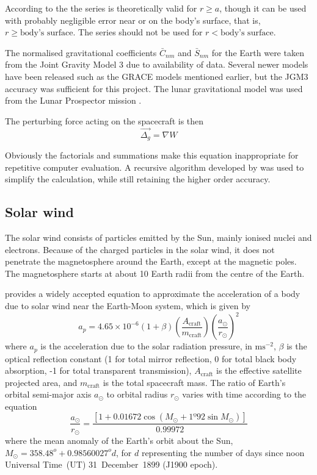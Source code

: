 According to the \textcite{WGS84} the series is theoretically valid for $r\geq a$, though it can be used with probably negligible error near or on the body's surface, that is, $r\geq\text{body's surface}$. The series should not be used for $r<\text{body's surface}$.

The normalised gravitational coefficients $\bar{C}_{nm}$ and $\bar{S}_{nm}$ for the Earth were taken from the Joint Gravity Model 3 \parencite[JGM3,][]{Tapley1996} due to availability of data. Several newer models have been released such as the GRACE models mentioned earlier, but the JGM3 accuracy was sufficient for this project. The lunar gravitational model was used from the Lunar Prospector mission \parencite{Konopliv2001}.

The perturbing force acting on the spacecraft is then
\begin{equation}
\vec{\Delta_g}=\nabla W\label{eq:Oblateness-perturbation}
\end{equation}

Obviously the factorials and summations make this equation inappropriate for repetitive computer evaluation. A recursive algorithm developed by \textcite{Montenbruck2000} was used to simplify the calculation, while still retaining the higher order accuracy. 


\subsection{Solar wind} \label{sub:Solar-Wind}

The solar wind consists of particles emitted by the Sun, mainly ionised nuclei and electrons. Because of the charged particles in the solar wind, it does not penetrate the magnetosphere around the Earth, except at the magnetic poles. The magnetosphere starts at about 10 Earth radii from the centre of the Earth.
 
\textcite[p. 223]{Chobotov2002} provides a widely accepted equation to approximate the acceleration
 of a body due to solar wind near the Earth-Moon system, which is given by 
\begin{equation}
a_{p}=4.65\times10^{-6}(1+\beta)\left(\frac{A_{\text{craft}}}{m_{\text{craft}}}\right)\left(\frac{a_{\odot}}{r_{\odot}}\right)^{2}\label{eq:solar-wind}
\end{equation}
where $a_{p}$ is the acceleration due to the solar radiation pressure, in $\text{ms}^{-2}$, $\beta$ is the optical reflection constant (1 for total mirror reflection, 0 for total black body absorption, -1 for total transparent transmission), $A_{\text{craft}}$ is the effective satellite projected area, and $m_{\text{craft}}$ is the total spacecraft mass. The ratio of Earth's orbital semi-major axis $a_{\odot}$ to orbital radius $r_{\odot}$ varies with time according to the equation 
\begin{equation}
\frac{a_{\odot}}{r_{\odot}}=\frac{[1+0.01672\cos(M_{\odot}+1º92\sin M_{\odot})]}{0.99972}\label{eq:a_sun/r_sun}
\end{equation}
where the mean anomaly of the Earth's orbit about the Sun, $M_{\odot}=358.48^{o}+0.98560027^{o}d$, for $d$ representing the number of days since noon Universal Time~(UT) 31~December~1899 (J1900 epoch).

